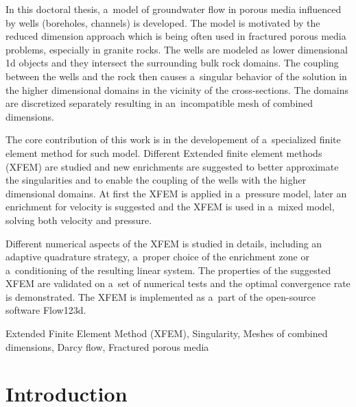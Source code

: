 \documentclass[bibliography=totocnumbered,dvipsnames,FM,Dis, EN]{tulthesis_autoreferat}
\begin{document}
\begin{abstractEN}
In this doctoral thesis, a~model of groundwater flow in porous media influenced by wells (boreholes, channels) is developed.
The model is motivated by the reduced dimension approach which is being often used in fractured porous media problems, especially in granite rocks.
The wells are modeled as lower dimensional 1d objects and they intersect the surrounding bulk rock domains.
The coupling between the wells and the rock then causes a~singular behavior of the solution in the higher dimensional domains
in the vicinity of the cross-sections. The domains are discretized separately resulting in an~incompatible mesh of combined dimensions.

The core contribution of this work is in the developement of a~specialized finite element method for such model.
Different Extended finite element methods (XFEM) are studied and new enrichments are suggested to better
approximate the singularities and to enable the coupling of the wells with the higher dimensional domains.
At first the XFEM is applied in a~pressure model, later an enrichment for velocity
is suggested and the XFEM is used in a~mixed model, solving both velocity and pressure.

Different numerical aspects of the XFEM is studied in details, including an adaptive quadrature strategy,
a~proper choice of the enrichment zone or a~conditioning of the resulting linear system.
The properties of the suggested XFEM are validated on a~set of numerical tests and the optimal convergence
rate is demonstrated. The XFEM is implemented as a~part of the open-source software Flow123d.

\end{abstractEN}

\begin{keywordsEN}
Extended Finite Element Method (XFEM), Singularity, Meshes of combined dimensions,
Darcy flow, Fractured porous media
\end{keywordsEN}

\clearpage

\tableofcontents
\clearpage




\chapter{Introduction}

\end{document}
